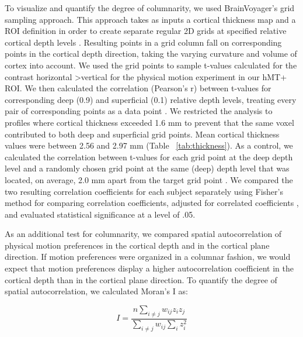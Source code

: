 To visualize and quantify the degree of columnarity, we used BrainVoyager's grid sampling approach. This approach takes as inputs a cortical thickness map and a ROI definition in order to create separate regular 2D grids at specified relative cortical depth levels \parencite{Zimmermann2011,Kemper2017}. Resulting points in a grid column fall on corresponding points in the cortical depth direction, taking the varying curvature and volume of cortex into account. We used the grid points to sample t-values calculated for the contrast horizontal \textgreater vertical for the physical motion experiment in our hMT+ ROI. We then calculated the correlation (Pearson's r) between t-values for corresponding deep (0.9) and superficial (0.1) relative depth levels, treating every pair of corresponding points as a data point \parencite{Nasr2016}. We restricted the analysis to profiles where cortical thickness exceeded 1.6 mm to prevent that the same voxel contributed to both deep and superficial grid points. Mean cortical thickness values were between 2.56 and 2.97 mm (Table ~\ref{tab:thickness}). As a control, we calculated the correlation between t-values for each grid point at the deep depth level and a randomly chosen grid point at the same (deep) depth level that was located, on average, 2.0 mm apart from the target grid point \parencite{Nasr2016}. We compared the two resulting correlation coefficients for each subject separately using Fisher’s method for comparing correlation coefficients, adjusted for correlated coefficients \parencite{Meng1992}, and evaluated statistical significance at a level of .05.

As an additional test for columnarity, we compared spatial autocorrelation of physical motion preferences in the cortical depth and in the cortical plane direction. If motion preferences were organized in a columnar fashion, we would expect that motion preferences display a higher autocorrelation coefficient in the cortical depth than in the cortical plane direction. To quantify the degree of spatial autocorrelation, we calculated Moran’s I \parencite{Moran1950, Rosenberg2010} as:

\begin{equation}
I = \frac{n \sum\limits_{i \neq j} w_{ij} z_i z_j}{\sum\limits_{i \neq j} w_{ij} \sum\limits_{i} z_i^2}
\end{equation}

